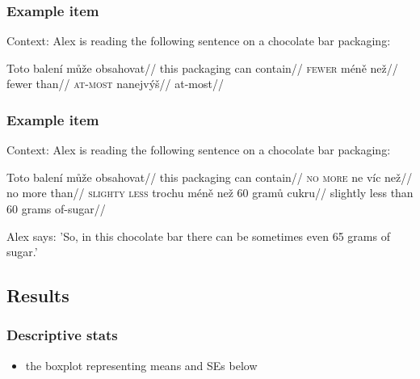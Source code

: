 \documentclass[10pt
]{beamer}
\newcommand{\cond}[1]{\textsc{#1}}
\begin{document}
\begin{frame}
  \frametitle{Example item}

Context: Alex is reading the following sentence on a chocolate bar packaging:

  \pex[aboveexskip=0pt]   \begingl
  \gla Toto balení může obsahovat//
  \glb this packaging can contain//
  \endgl
  \a \hfill \cond{fewer}
  \begingl
  \gla méně než//
  \glb fewer than//
  \endgl
  \a \hfill \cond{at-most}
  \begingl
  \gla nanejvýš// 
  \glb at-most//
  \endgl
  \xe
  

\end{frame}

\begin{frame}
  \frametitle{Example item}

Context: Alex is reading the following sentence on a chocolate bar packaging:

  \pex[aboveexskip=0pt] 
  \begingl
  \gla Toto balení může obsahovat//
  \glb this packaging can contain//
  \endgl
  \a \hfill \cond{no more}
  \begingl
  \gla ne víc než//
  \glb no more than//
  \endgl
  \a \hfill \cond{slighty less}
  \begingl
  \gla trochu méně než  60 gramů cukru//
  \glb slightly less than 60 grams of-sugar//
  \endgl
  \xe

  Alex says: 'So, in this chocolate bar there can be sometimes even 65 grams of sugar.'

  

\end{frame}

\subsection{Results}

\begin{frame}
  \frametitle{Descriptive stats}

  \begin{itemize}
    \item the boxplot representing means and SEs below
  \end{itemize}


  

\end{frame}
\end{document}
